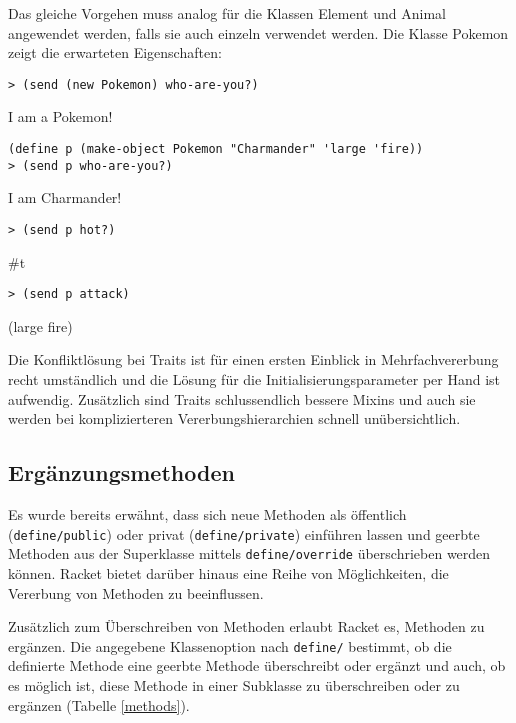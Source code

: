 Das gleiche Vorgehen muss analog für die Klassen Element und Animal angewendet werden, falls sie auch einzeln verwendet werden. Die Klasse Pokemon zeigt die erwarteten Eigenschaften:

\begin{lstlisting}
> (send (new Pokemon) who-are-you?)
\end{lstlisting}
{\routput {\qq}I am a Pokemon!\qq}

\begin{lstlisting}
(define p (make-object Pokemon "Charmander" 'large 'fire))
> (send p who-are-you?)
\end{lstlisting}
{\routput {\qq}I am Charmander!\qq}

\begin{lstlisting}
> (send p hot?)
\end{lstlisting}
{\routput \#t}

\begin{lstlisting}
> (send p attack)
\end{lstlisting}
{\rsymbol (large fire)}

Die Konfliktlösung bei Traits ist für einen ersten Einblick in Mehrfachvererbung recht umständlich und die Lösung für die Initialisierungsparameter per Hand ist aufwendig. Zusätzlich sind Traits schlussendlich bessere Mixins und auch sie werden bei komplizierteren Vererbungshierarchien schnell unübersichtlich.

\subsection{Ergänzungsmethoden}

Es wurde bereits erwähnt, dass sich neue Methoden als öffentlich (\texttt{define/public}) oder privat (\texttt{define/private}) einführen lassen und geerbte Methoden aus der Superklasse mittels \texttt{define/override} überschrieben werden können. Racket bietet darüber hinaus eine Reihe von Möglichkeiten, die Vererbung von Methoden zu beeinflussen.

Zusätzlich zum Überschreiben von Methoden erlaubt Racket es, Methoden zu ergänzen. Die angegebene Klassenoption nach \texttt{define/} bestimmt, ob die definierte Methode eine geerbte Methode überschreibt oder ergänzt und auch, ob es möglich ist, diese Methode in einer Subklasse zu überschreiben oder zu ergänzen (Tabelle \ref{methods}).

